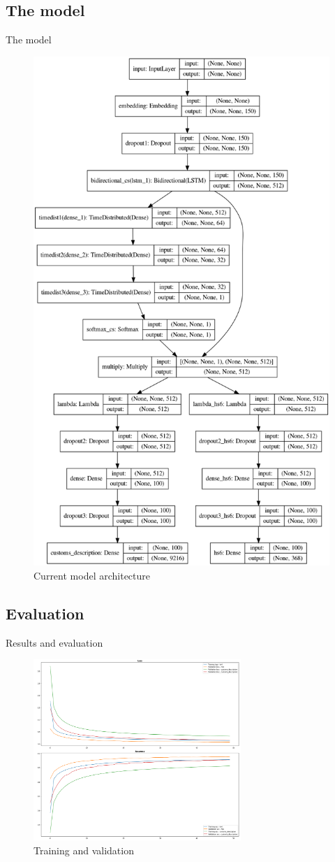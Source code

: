 \documentclass[9pt]{beamer}
\begin{document}
\subsection{The model}
\begin{frame}{The model}
	\begin{figure}
		\includegraphics[height=0.6\textwidth]{imgs/model.png}
		\caption{Current model architecture}
	\end{figure}
\end{frame}


\subsection{Evaluation}
\begin{frame}{Results and evaluation}
\begin{figure}
		\includegraphics[width=0.7\textwidth]{imgs/training.png}
		\caption{Training and validation}
	\end{figure}
\end{frame}
\end{document}
